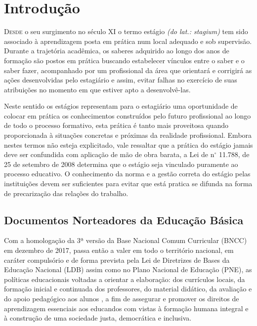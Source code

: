 
\chapter{Introdução}
\lettrine{D}{esde} o seu surgimento no século XI o termo estágio \emph{(do lat.: stagium)} tem sido associado à aprendizagem posta em prática num local adequado e sob supervisão. Durante a trajetória acadêmica, os saberes adquirido ao longo dos anos de formação são postos em prática buscando estabelecer vínculos entre o saber e o saber fazer, acompanhado por um profissional da área que orientará e corrigirá as ações desenvolvidas pelo estagiário e assim, evitar falhas no exercício de suas atribuições no momento em que estiver apto a desenvolvê-las.

Neste sentido os estágios representam para o estagiário uma oportunidade de colocar em prática os conhecimentos construídos pelo futuro profissional ao longo de todo o processo formativo, esta prática é tanto mais proveitosa quando proporcionada à situações concretas e próximas da realidade profissional. Embora nestes termos não esteja explicitado, vale ressaltar que a prática do estágio jamais deve ser confundida com aplicação de mão de obra barata, a Lei de n$^\circ$ 11.788, de 25 de setembro de 2008 determina que o estágio seja vinculado puramente ao processo educativo. O conhecimento da norma e a gestão correta do estágio pelas instituições devem ser suficientes para evitar que está pratica se difunda na forma de precarização das relações do trabalho.

\section{Documentos Norteadores da Educação Básica}
Com a homologação da 3ª versão da Base Nacional Comum Curricular (BNCC) em dezembro de 2017, passa então a valer em todo o território nacional, em caráter compulsório e de forma prevista pela Lei de Diretrizes de Bases da Educação Nacional (LDB) assim como no Plano Nacional de Educação (PNE), as políticas educacionais voltadas a orientar a elaboração: dos currículos locais, da formação inicial e continuada dos professores, do material didático, da avaliação e do apoio pedagógico aos alunos \cite{BRASIL:2017}, a fim de assegurar e promover os direitos de aprendizagem essenciais aos educandos com vistas à formação humana integral e à construção de uma sociedade justa, democrática e inclusiva.

